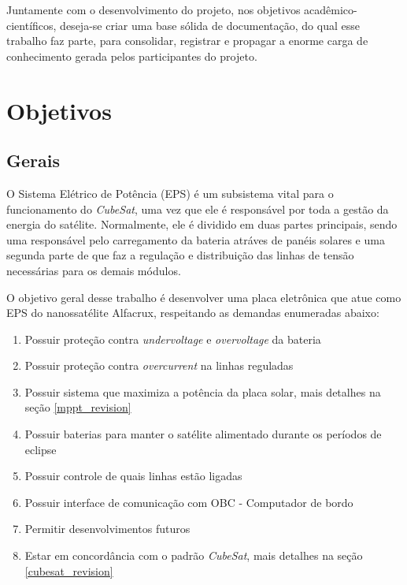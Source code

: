 Juntamente com o desenvolvimento do projeto, nos objetivos acadêmico-científicos, deseja-se criar uma base sólida de documentação, do qual esse trabalho faz parte, para consolidar, registrar e propagar a enorme carga de conhecimento gerada pelos participantes do projeto.

\section{Objetivos}
\subsection{Gerais}\label{gerais}

O Sistema Elétrico de Potência (EPS) é um subsistema vital para o funcionamento do \textit{CubeSat}, uma vez que ele é responsável por toda a gestão da energia do satélite. Normalmente, ele é dividido em duas partes principais, sendo uma responsável pelo carregamento da bateria atráves de panéis solares e uma segunda parte de que faz a regulação e distribuição das linhas de tensão necessárias para os demais módulos. 

O objetivo geral desse trabalho é desenvolver uma placa eletrônica que atue como EPS do nanossatélite Alfacrux, respeitando as demandas enumeradas abaixo:

\begin{enumerate}
    \item Possuir proteção contra \textit{undervoltage} e \textit{overvoltage} da bateria
    \item Possuir proteção contra \textit{overcurrent} na linhas reguladas
    \item Possuir sistema que maximiza a potência da placa solar, mais detalhes na seção \ref{mppt_revision}
    \item Possuir baterias para manter o satélite alimentado durante os períodos de eclipse
    \item Possuir controle de quais linhas estão ligadas
    \item Possuir interface de comunicação com OBC - Computador de bordo
    \item Permitir desenvolvimentos futuros
    \item Estar em concordância com o padrão \textit{CubeSat}, mais detalhes na seção \ref{cubesat_revision}
\end{enumerate}{}


